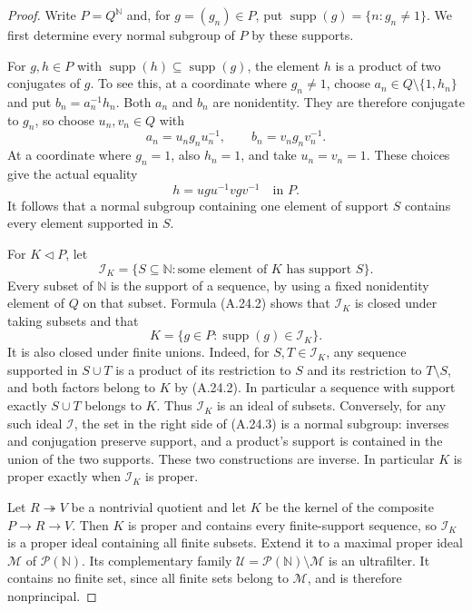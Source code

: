 \begin{proof}
Write $P=Q^{\mathbb N}$ and, for $g=(g_n)\in P$, put
$\operatorname{supp}(g)=\{n:g_n\ne1\}$. We first determine every
normal subgroup of $P$ by these supports.

For $g,h\in P$ with
$\operatorname{supp}(h)\subseteq\operatorname{supp}(g)$, the
element $h$ is a product of two conjugates of $g$. To see this,
at a coordinate where $g_n\ne1$, choose
$a_n\in Q\setminus\{1,h_n\}$ and put $b_n=a_n^{-1}h_n$.
Both $a_n$ and $b_n$ are nonidentity. They are therefore conjugate
to $g_n$, so choose $u_n,v_n\in Q$ with
\[
 a_n=u_ng_nu_n^{-1},\qquad b_n=v_ng_nv_n^{-1}.
\]
At a coordinate where $g_n=1$, also $h_n=1$, and take
$u_n=v_n=1$. These choices give the actual equality
\[
 h=ugu^{-1}vgv^{-1}\quad\text{in }P.
 \tag{A.24.2}
\]
It follows that a normal subgroup containing one element of
support $S$ contains every element supported in $S$.

For $K\triangleleft P$, let
\[
 \mathcal I_K=\{S\subseteq\mathbb N:
       \text{some element of }K\text{ has support }S\}.
\]
Every subset of $\mathbb N$ is the support of a sequence, by
using a fixed nonidentity element of $Q$ on that subset.
Formula (A.24.2) shows that $\mathcal I_K$ is closed under
taking subsets and that
\[
 K=\{g\in P:\operatorname{supp}(g)\in\mathcal I_K\}.
 \tag{A.24.3}
\]
It is also closed under finite unions. Indeed, for
$S,T\in\mathcal I_K$, any sequence supported in $S\cup T$
is a product of its restriction to $S$ and its restriction to
$T\setminus S$, and both factors belong to $K$ by (A.24.2).
In particular a sequence with support exactly $S\cup T$ belongs
to $K$. Thus $\mathcal I_K$ is an ideal of subsets. Conversely,
for any such ideal $\mathcal I$, the set in the right side of
(A.24.3) is a normal subgroup: inverses and conjugation preserve
support, and a product's support is contained in the union of
the two supports. These two constructions are inverse. In
particular $K$ is proper exactly when $\mathcal I_K$ is proper.

Let $R\twoheadrightarrow V$ be a nontrivial quotient and let
$K$ be the kernel of the composite $P\to R\to V$. Then $K$
is proper and contains every finite-support sequence, so
$\mathcal I_K$ is a proper ideal containing all finite subsets.
Extend it to a maximal proper ideal $\mathcal M$ of
$\mathcal P(\mathbb N)$. Its complementary family
$\mathcal U=\mathcal P(\mathbb N)\setminus\mathcal M$ is an
ultrafilter. It contains no finite set, since all finite sets
belong to $\mathcal M$, and is therefore nonprincipal.


\end{proof}
